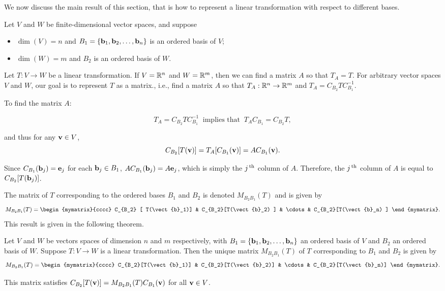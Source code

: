 We now discuss the main result of this section, that is how to
represent a linear transformation with respect to different bases.

Let $V$ and $W$ be finite-dimensional vector spaces, and suppose
\begin{itemize}
\item $\dim(V)=n$ and
  $B_1=\left\{\mbox{\bf b}_1, \mbox{\bf b}_2, \ldots, \mbox{\bf b}_n\right\}$ is an ordered
  basis of $V$;
\item $\dim(W)=m$ and $B_2$ is an ordered basis of $W$.
\end{itemize}
Let $T:V\to W$ be a linear transformation.  If $V=\mathbb{R}^n$ and $W=\mathbb{R}^m$,
then we can find a matrix $A$ so that $T_A=T$. For arbitrary vector
spaces $V$ and $W$, our goal is to represent $T$ as a matrix., i.e.,
find a matrix $A$ so that $T_A:\mathbb{R}^n\to\mathbb{R}^m$ and
$T_A=C_{B_2}TC_{B_1}^{-1}$.

To find the matrix $A$:

\begin{equation*}
  T_A=C_{B_2}TC_{B_1}^{-1}~\mbox{ implies that }~
  T_AC_{B_1}=C_{B_2}T,
\end{equation*}

and thus for any $\mbox{\bf v}\in V$,
\begin{equation*}
  C_{B_2}[T(\mbox{\bf v})] = T_A[C_{B_1}(\mbox{\bf v})]
  =AC_{B_1}(\mbox{\bf v}).
\end{equation*}

Since $C_{B_1}(\mbox{\bf b}_j)=\mbox{\bf e}_j$ for each $\mbox{\bf b}_j\in B_1$,
$AC_{B_1}(\mbox{\bf b}_j)=A\mbox{\bf e}_j$, which is simply the $j^{\,\rm th}$ column
of $A$.  Therefore, the $j^{\,\rm th}$ column of $A$ is equal to
$C_{B_2}[T(\mbox{\bf b}_j)]$.

The matrix of $T$ corresponding to the ordered bases $B_1$ and $B_2$
is denoted $ M_{B_2B_1}(T)$ and is given by
\begin{equation*}
  M_{B_2B_1}(T)=
  \begin{mymatrix}{cccc}
    C_{B_2} [ T(\vect{b}_1)] & C_{B_2}[T(\vect{b}_2) ] &
    \cdots & C_{B_2}[T(\vect{b}_n) ] \end{mymatrix}.
\end{equation*}
This result is given in the following theorem.

\begin{theorem}{}{}
  Let $V$ and $W$ be vectors spaces of dimension $n$ and $m$
  respectively, with
  $B_1=\left\{\mbox{\bf b}_1, \mbox{\bf b}_2, \ldots, \mbox{\bf b}_n\right\}$ an ordered
  basis of $V$ and $B_2$ an ordered basis of $W$. Suppose $T:V\to W$
  is a linear transformation. Then the unique matrix $M_{B_2B_1}(T)$
  of $T$ corresponding to $B_1$ and $B_2$ is given by
  \begin{equation*}
    M_{B_2B_1}(T)=
    \begin{mymatrix}{cccc}
      C_{B_2}[T(\vect{b}_1)] & C_{B_2}[T(\vect{b}_2)] &
      \cdots & C_{B_2}[T(\vect{b}_n)] \end{mymatrix}.
  \end{equation*}

  This matrix satisfies
  $C_{B_2}[T(\mbox{\bf v})]=M_{B_2B_1}(T)C_{B_1}(\mbox{\bf v})$ for all
  $\mbox{\bf v}\in V$.
\end{theorem}

